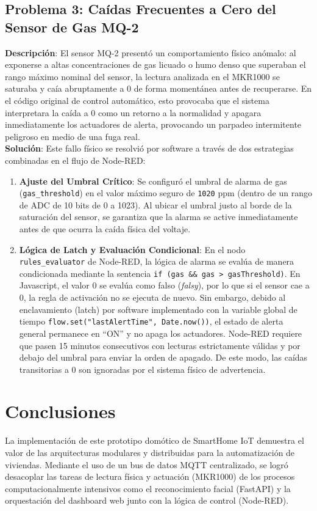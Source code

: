 \documentclass[12pt,letterpaper]{article}
\begin{document}
\subsection{Problema 3: Caídas Frecuentes a Cero del Sensor de Gas MQ-2}
\textbf{Descripción}: El sensor MQ-2 presentó un comportamiento físico anómalo: al exponerse a altas concentraciones de gas licuado o humo denso que superaban el rango máximo nominal del sensor, la lectura analizada en el MKR1000 se saturaba y caía abruptamente a 0 de forma momentánea antes de recuperarse. En el código original de control automático, esto provocaba que el sistema interpretara la caída a 0 como un retorno a la normalidad y apagara inmediatamente los actuadores de alerta, provocando un parpadeo intermitente peligroso en medio de una fuga real. \\
\textbf{Solución}: Este fallo físico se resolvió por software a través de dos estrategias combinadas en el flujo de Node-RED:
\begin{enumerate}
    \item \textbf{Ajuste del Umbral Crítico}: Se configuró el umbral de alarma de gas (\texttt{gas\_threshold}) en el valor máximo seguro de \texttt{1020} ppm (dentro de un rango de ADC de 10 bits de 0 a 1023). Al ubicar el umbral justo al borde de la saturación del sensor, se garantiza que la alarma se active inmediatamente antes de que ocurra la caída física del voltaje.
    \item \textbf{Lógica de Latch y Evaluación Condicional}: En el nodo \texttt{rules\_evaluator} de Node-RED, la lógica de alarma se evalúa de manera condicionada mediante la sentencia \texttt{if (gas \&\& gas > gasThreshold)}. En Javascript, el valor 0 se evalúa como falso (\emph{falsy}), por lo que si el sensor cae a 0, la regla de activación no se ejecuta de nuevo. Sin embargo, debido al enclavamiento (latch) por software implementado con la variable global de tiempo \texttt{flow.set("lastAlertTime", Date.now())}, el estado de alerta general permanece en ``ON'' y no apaga los actuadores. Node-RED requiere que pasen 15 minutos consecutivos con lecturas estrictamente válidas y por debajo del umbral para enviar la orden de apagado. De este modo, las caídas transitorias a 0 son ignoradas por el sistema físico de advertencia.
\end{enumerate}

\section{Conclusiones}
La implementación de este prototipo domótico de SmartHome IoT demuestra el valor de las arquitecturas modulares y distribuidas para la automatización de viviendas. Mediante el uso de un bus de datos MQTT centralizado, se logró desacoplar las tareas de lectura física y actuación (MKR1000) de los procesos computacionalmente intensivos como el reconocimiento facial (FastAPI) y la orquestación del dashboard web junto con la lógica de control (Node-RED).
\end{document}
